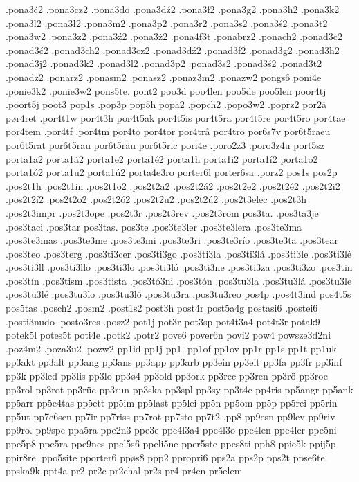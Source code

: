 {{.pona3ć2
.pona3cz2
.pona3do
.pona3dź2
.pona3f2
.pona3g2
.pona3h2
.pona3k2
.pona3l2
.pona3ł2
.pona3m2
.pona3p2
.pona3r2
.pona3s2
.pona3ś2
.pona3t2
.pona3w2
.pona3z2
.pona3ź2
.pona3ż2
.pona4f3t
.ponabrz2
.ponach2
.ponad3c2
.ponad3ć2
.ponad3ch2
.ponad3cz2
.ponad3dź2
.ponad3f2
.ponad3g2
.ponad3h2
.ponad3j2
.ponad3k2
.ponad3l2
.ponad3p2
.ponad3s2
.ponad3ś2
.ponad3t2
.ponadz2
.ponarz2
.ponasm2
.ponasz2
.ponaz3m2
.ponazw2
pongs6
poni4e
.ponie3k2
.ponie3w2
pons5te.
pont2
poo3d
poo4len
poo5de
poo5len
poor4tj
.poort5j
poot3
pop1s
.pop3p
pop5h
popa2
.popch2
.popo3w2
.poprz2
por2ä
pør4ret
.por4t1w
por4t3h
por4t5ak
por4t5is
por4t5ra
por4t5re
por4t5ro
por4tae
por4tem
.por4tf
.por4tm
por4to
por4tor
por4trå
por4tro
por6s7v
por6t5raeu
por6t5rat
por6t5rau
por6t5räu
por6t5ric
pori4e
.poro2z3
.poro3z4u
port5sz
porta1a2
porta1á2
porta1e2
porta1é2
porta1h
porta1i2
porta1í2
porta1o2
porta1ó2
porta1u2
porta1ú2
porta4e3ro
porter6l
porter6sa
.porz2
pos1s
pos2p
.pos2t1h
.pos2t1in
.pos2t1o2
.pos2t2a2
.pos2t2á2
.pos2t2e2
.pos2t2é2
.pos2t2i2
.pos2t2í2
.pos2t2o2
.pos2t2ó2
.pos2t2u2
.pos2t2ú2
.pos2t3elec
.pos2t3h
.pos2t3impr
.pos2t3ope
.pos2t3r
.pos2t3rev
.pos2t3rom
pos3ta.
.pos3ta3je
.pos3taci
.pos3tar
pos3tas.
pos3te
.pos3te3ler
.pos3te3lera
.pos3te3ma
.pos3te3mas
.pos3te3me
.pos3te3mi
.pos3te3ri
.pos3te3río
.pos3te3ta
.pos3tear
.pos3teo
.pos3terg
.pos3ti3cer
.pos3ti3go
.pos3ti3la
.pos3ti3lá
.pos3ti3le
.pos3ti3lé
.pos3ti3ll
.pos3ti3llo
.pos3ti3lo
.pos3ti3ló
.pos3ti3ne
.pos3ti3za
.pos3ti3zo
.pos3tin
.pos3tín
.pos3tism
.pos3tista
.pos3tó3ni
.pos3tón
.pos3tu3la
.pos3tu3lá
.pos3tu3le
.pos3tu3lé
.pos3tu3lo
.pos3tu3ló
.pos3tu3ra
.pos3tu3reo
pos4p
.pos4t3ind
pos4t5s
pos5tas
.posch2
.posm2
.post1s2
post3h
post4r
post5a4g
postasi6
.postei6
.posti3nudo
.posto3res
.posz2
pot1j
pot3r
pot3sp
pot4t3a4
pot4t3r
potak9
potek5l
potes5t
poti4e
.potk2
.potr2
pove6
pover6n
povi2
pow4
powsze3d2ni
.poz4m2
.poza3u2
.pozw2
pp1id
pp1j
pp1l
pp1of
pp1ov
pp1r
pp1s
pp1t
pp1uk
pp3akt
pp3alt
pp3ang
pp3ans
pp3app
pp3arb
pp3ein
pp3eit
pp3fa
pp3fr
pp3inf
pp3k
pp3led
pp3lis
pp3lo
pp3ø4
pp3old
pp3ork
pp3rec
pp3ren
pp3rö
pp3roe
pp3rol
pp3rot
pp3rüc
pp3run
pp3ska
pp3spl
pp3sy
pp3t4e
pp4ris
pp5angr
pp5ank
pp5arr
pp5e4tas
pp5ett
pp5im
pp5last
pp5lei
pp5n
pp5om
pp5p
pp5rei
pp5rin
pp5ut
pp7e6sen
pp7ir
pp7riss
pp7rot
pp7sto
pp7t2
.pp8
pp9esn
pp9lev
pp9riv
pp9ro.
pp9spe
ppa5ra
ppe2n3
ppe3e
ppe4l3a4
ppe4l3o
ppe4len
ppe4ler
ppe5ni
ppe5p8
ppe5ra
ppe9nes
ppel5s6
ppeli5ne
pper5ste
ppes8ti
pph8
ppie5k
ppij5p
ppir8re.
ppo5site
pporter6
ppøs8
ppp2
ppropri6
pps2a
pps2p
pps2t
ppse6te.
ppska9k
ppt4a
pr2
pr2c
pr2chal
pr2s
pr4
pr4en
pr5elem
}}

